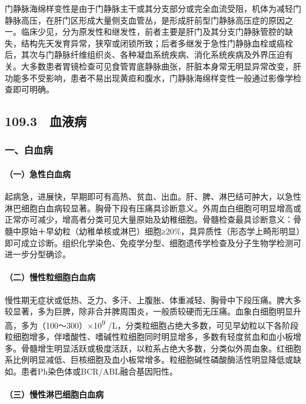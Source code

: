 门静脉海绵样变性是由于门静脉主干或其分支部分或完全血流受阻，机体为减轻门静脉高压，在肝门区形成大量侧支血管丛，是形成肝前型门静脉高压症的原因之一。临床少见，分为原发性和继发性，前者主要是肝门及其分支门静脉管腔的缺失，结构先天发育异常，狭窄或闭锁所致；后者多继发于急性门静脉血栓或癌栓后，其次与门静脉纤维组织炎、各种凝血系统疾病、消化系统疾病及外界压迫有关。大多数患者胃镜检查可见食管胃底静脉曲张，肝脏本身常无明显异常改变，肝功能多不受影响，患者不易出现黄疸和腹水，门静脉海绵样变性一般通过影像学检查即可明确。

\protect\hypertarget{text00248.html}{}{}

\subsection{109.3　血液病}

\subsubsection{一、白血病}

\paragraph{（一）急性白血病}

起病急，进展快，早期即可有高热、贫血、出血。肝、脾、淋巴结可肿大，以急性淋巴细胞白血病较显著。胸骨下段有压痛具诊断意义。外周血白细胞可明显增高或正常亦可减少，增高者分类可见大量原始及幼稚细胞。骨髓检查最具诊断意义：骨髓中原始＋早幼粒（幼稚单核或淋巴）细胞≥20\%，具异质性（形态学上畸形明显）即可成立诊断。组织化学染色、免疫学分型、细胞遗传学检查及分子生物学检测可进一步分型确诊。

\paragraph{（二）慢性粒细胞白血病}

慢性期无症状或低热、乏力、多汗、上腹胀、体重减轻、胸骨中下段压痛。脾大多较显著，多为巨脾，除非合并脾周围炎，一般质较硬而无压痛。血象白细胞明显升高，多为（100～300）×10\textsuperscript{9}
/L，分类粒细胞占绝大多数，可见早幼粒以下各阶段粒细胞增多，伴嗜酸性、嗜碱性粒细胞同时明显增多，多数有轻度贫血和血小板增多。骨髓增生明显活跃或极度活跃，以粒系占绝大多数，分类似外周血象。红细胞系比例明显减低、巨核细胞及血小板常增多。粒细胞碱性磷酸酶活性明显降低或缺如。患者Ph染色体或BCR/ABL融合基因阳性。

\paragraph{（三）慢性淋巴细胞白血病}

